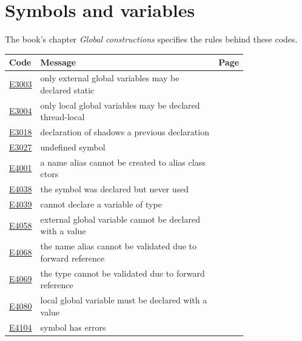 
\clearpage
\section{Symbols and variables}
\label{sec:codes:symbols}

The book's chapter \textit{Global constructions} specifies the rules behind these codes.

\begin{longtable}{@{}l p{0.78\linewidth} r@{}}
\toprule Code & Message & Page\\ \midrule \endhead
\hyperref[sec:codes:e3003]{E3003} & only external global variables may be declared static & \pageref{sec:codes:e3003}\\
\hyperref[sec:codes:e3004]{E3004} & only local global variables may be declared thread-local & \pageref{sec:codes:e3004}\\
\hyperref[sec:codes:e3018]{E3018} & declaration of \errhole{} shadows a previous declaration & \pageref{sec:codes:e3018}\\
\hyperref[sec:codes:e3027]{E3027} & undefined symbol \errhole{} & \pageref{sec:codes:e3027}\\
\hyperref[sec:codes:e4001]{E4001} & a name alias cannot be created to alias class ctors & \pageref{sec:codes:e4001}\\
\hyperref[sec:codes:e4038]{E4038} & the symbol \errhole{} was declared but never used & \pageref{sec:codes:e4038}\\
\hyperref[sec:codes:e4039]{E4039} & cannot declare a variable of type \errhole{} & \pageref{sec:codes:e4039}\\
\hyperref[sec:codes:e4058]{E4058} & external global variable cannot be declared with a value & \pageref{sec:codes:e4058}\\
\hyperref[sec:codes:e4068]{E4068} & the name alias \errhole{} cannot be validated due to forward reference & \pageref{sec:codes:e4068}\\
\hyperref[sec:codes:e4069]{E4069} & the type cannot be validated due to forward reference & \pageref{sec:codes:e4069}\\
\hyperref[sec:codes:e4080]{E4080} & local global variable must be declared with a value & \pageref{sec:codes:e4080}\\
\hyperref[sec:codes:e4104]{E4104} & symbol \errhole{} has errors & \pageref{sec:codes:e4104}\\

\end{longtable}
